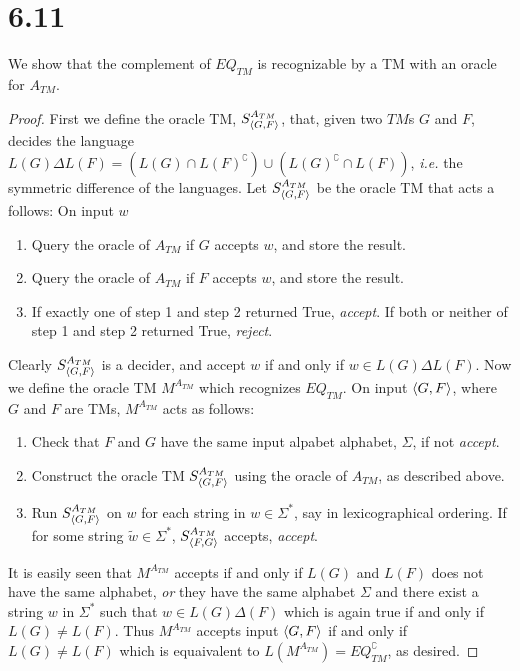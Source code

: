 \documentclass[a4paper,11pt]{article}
\newcommand{\ie}{\emph{i.e.} }
\numberwithin{equation}{section}
\begin{document}
\section*{6.11} We show that the complement of $ EQ_{TM} $ is recognizable by a TM with an oracle for $ A_{TM} $. 
\begin{proof}
	First we define the oracle TM, $ S_{\braket{G,F}}^{A_{TM}} $, that, given two $ TM $s $ G $ and $ F $, decides the language $ L(G)\Delta L(F)=(L(G)\cap  L(F)^\complement)\cup (L(G)^\complement\cap L(F))  $, \ie the symmetric difference of the languages. Let $ S_{\braket{G,F}}^{A_{TM}} $ be the oracle TM that acts a follows: On input $ w $ \begin{enumerate}
		\item Query the oracle of $ A_{TM} $ if $ G $ accepts $ w $, and store the result.
		\item Query the oracle of $ A_{TM} $ if $ F $ accepts $ w $, and store the result.
		\item If exactly one of step 1 and step 2 returned True, \emph{accept}. If both or neither of step 1 and step 2 returned True, \emph{reject}.
	\end{enumerate}
	Clearly $ S_{\braket{G,F}}^{A_{TM}} $ is a decider, and accept $ w $ if and only if $ w\in L(G)\Delta L(F) $.
	Now we define the oracle TM $ M^{A_{TM}} $ which recognizes $ EQ_{TM} $. On input $ \braket{G,F} $, where $ G $ and $ F $ are TMs, $ M^{A_{TM}} $ acts as follows:\begin{enumerate}
		\item Check that $ F $ and $ G $ have the same input alpabet alphabet, $ \Sigma $, if not \emph{accept}.
		\item Construct the oracle TM $ S^{A_{TM}}_{\braket{G,F}} $ using the oracle of $ A_{TM} $, as described above.
		\item Run $ S^{A_{TM}}_{\braket{G,F}} $ on $ w $ for each string in $ w\in \Sigma^\ast $, say in lexicographical ordering. If for some string $ \tilde{w}\in\Sigma^* $, $ S^{A_{TM}}_{\braket{F,G}} $ accepts, \emph{accept}.
	\end{enumerate}
	It is easily seen that $ M^{A_{TM}} $ accepts if and only if $ L(G) $ and $ L(F) $ does not have the same alphabet, \emph{or} they have the same alphabet $ \Sigma $ and there exist a string $ w $ in $ \Sigma^* $ such that $ w\in L(G)\Delta(F) $ which is again true if and only if $ L(G)\neq L(F) $. Thus $ M^{A_{TM}} $ accepts input $ \braket{G,F} $ if and only if $ L(G)\neq L(F) $ which is equaivalent to $ L(M^{A_{TM}})=EQ_{TM}^\complement $, as desired.
\end{proof}
\end{document}
